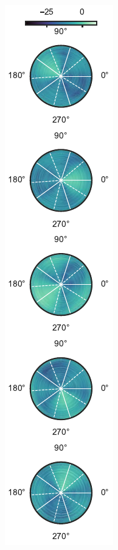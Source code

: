\documentclass[sip,biber]{now-journal}
\begin{document}
\begin{figure}[t]
\begin{minipage}[t]{.3\linewidth}
    \centering\includegraphics{figures/plots/beam-pattern/polar_RTcov_rot.pdf}\label{fig:plot:bp:pol:cov}
  \end{minipage}
  \begin{minipage}[t]{.3\linewidth}

\end{minipage}
\end{figure}
\end{document}
